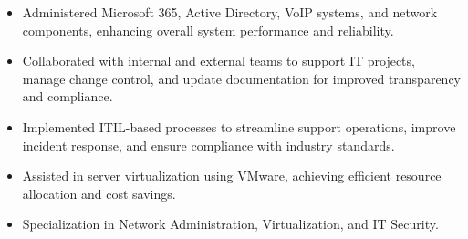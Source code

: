 \par\smallskip
\noindent
\begin{minipage}{20cm}
  \begin{minipage}{9.75cm}
    \begin{itemize}
      \item Administered Microsoft 365, Active Directory, VoIP systems, and network components, enhancing overall system performance and reliability.
      \item Collaborated with internal and external teams to support IT projects, manage change control, and update documentation for improved transparency and compliance.
    \end{itemize}
  \end{minipage}
  \hfill
  \begin{minipage}{9.75cm}
    \begin{itemize}
      \item Implemented ITIL-based processes to streamline support operations, improve incident response, and ensure compliance with industry standards.
      \item Assisted in server virtualization using VMware, achieving efficient resource allocation and cost savings.
    \end{itemize}
  \end{minipage}
\end{minipage}

\begin{itemize}
  \item Specialization in Network Administration, Virtualization, and IT Security.
\end{itemize}


\noindent
\begin{minipage}{20cm}
\end{minipage}


